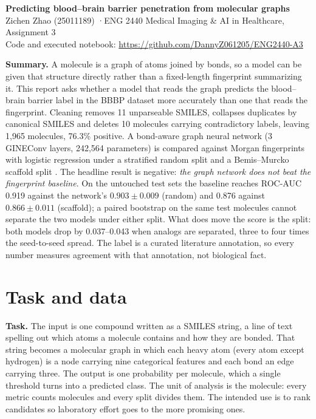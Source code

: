 \documentclass[11pt,a4paper]{article}
\newcommand{\repourl}{https://github.com/DannyZ061205/ENG2440-A3}
\begin{document}
\begin{center}
{\Large\bfseries Predicting blood--brain barrier penetration from molecular graphs}\\[3pt]
Zichen Zhao (25011189) \quad·\quad ENG 2440 Medical Imaging \& AI in Healthcare, Assignment 3\\[1pt]
Code and executed notebook: \url{\repourl}
\end{center}
\suppressfloats[t]  %

\noindent\textbf{Summary.} A molecule is a graph of atoms joined by bonds, so a model can be given that
structure directly rather than a fixed-length fingerprint summarizing it. This report asks whether a model
that reads the graph predicts the blood--brain barrier label in the BBBP dataset \cite{wu2018,martins2012}
more accurately than one that reads the fingerprint. Cleaning removes 11 unparseable SMILES, collapses
duplicates by canonical SMILES and deletes 10 molecules carrying contradictory labels, leaving
1,965 molecules, 76.3\% positive. A bond-aware graph neural network (3 GINEConv layers, 242,564
parameters) is compared against Morgan fingerprints with logistic regression under a stratified random
split and a Bemis--Murcko scaffold split \cite{bemis1996}. The headline result is negative: \emph{the
graph network does not beat the fingerprint baseline}. On the untouched test sets the baseline reaches
ROC-AUC 0.919 against the network's $0.903 \pm 0.009$ (random) and 0.876 against $0.866 \pm 0.011$
(scaffold); a paired bootstrap on the same test molecules cannot separate the two models under either
split. What does move the score is the split: both models drop by 0.037--0.043 when analogs are separated,
three to four times the seed-to-seed spread. The label is a curated literature annotation, so every number
measures agreement with that annotation, not biological fact.

\section{Task and data}

\textbf{Task.} The input is one compound written as a SMILES string, a line of text spelling out which
atoms a molecule contains and how they are bonded. That string becomes a molecular graph in which each
heavy atom (every atom except hydrogen) is a node carrying nine categorical features and each bond an
edge carrying three. The output is one probability per molecule, which a single threshold turns into a
predicted class. The unit of analysis is the molecule: every metric counts molecules and every split
divides them. The intended use is to rank candidates so laboratory effort goes to the more promising
ones.
\end{document}
